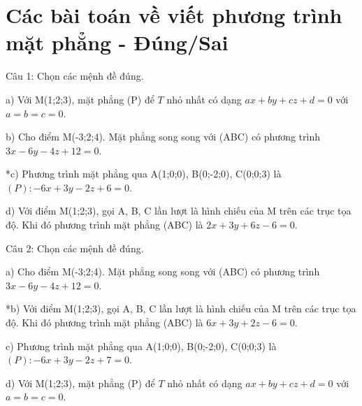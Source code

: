 \documentclass[a4paper,12pt]{article}
\begin{document}
\section*{Các bài toán về viết phương trình mặt phẳng - Đúng/Sai}

Câu 1: Chọn các mệnh đề đúng.

a) Với M(1;2;3), mặt phẳng (P) để $T$ nhỏ nhất có dạng $ax+by+cz+d=0$ với $a=b=c=0$.

b) Cho điểm M(-3;2;4). Mặt phẳng song song với (ABC) có phương trình $3x-6y-4z+12=0$.

*c) Phương trình mặt phẳng qua A(1;0;0), B(0;-2;0), C(0;0;3) là $(P): -6x + 3y - 2z + 6 = 0$.

d) Với điểm M(1;2;3), gọi A, B, C lần lượt là hình chiếu của M trên các trục tọa độ. Khi đó phương trình mặt phẳng (ABC) là $2x+3y+6z-6=0$.



Câu 2: Chọn các mệnh đề đúng.

a) Cho điểm M(-3;2;4). Mặt phẳng song song với (ABC) có phương trình $3x-6y-4z+12=0$.

*b) Với điểm M(1;2;3), gọi A, B, C lần lượt là hình chiếu của M trên các trục tọa độ. Khi đó phương trình mặt phẳng (ABC) là $6x+3y+2z-6=0$.

c) Phương trình mặt phẳng qua A(1;0;0), B(0;-2;0), C(0;0;3) là $(P): -6x + 3y - 2z + 7 = 0$.

d) Với M(1;2;3), mặt phẳng (P) để $T$ nhỏ nhất có dạng $ax+by+cz+d=0$ với $a=b=c=0$.
\end{document}
